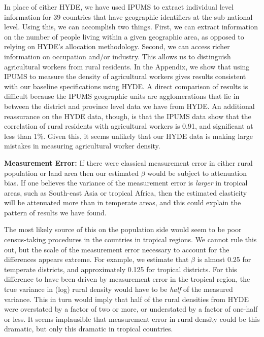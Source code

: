 \documentclass[11pt]{article}
\begin{document}
In place of either HYDE, we have used IPUMS \nocite{ipums} to extract individual level information for 39 countries that have geographic identifiers at the sub-national level. Using this, we can accomplish two things. First, we can extract information on the number of people living within a given geographic area, as opposed to relying on HYDE's allocation methodology. Second, we can access richer information on occupation and/or industry. This allows us to distinguish agricultural workers from rural residents. In the Appendix, we show that using IPUMS to measure the density of agricultural workers gives results consistent with our baseline specifications using HYDE. A direct comparison of results is difficult because the IPUMS geographic units are agglomerations that lie in between the district and province level data we have from HYDE. An additional reassurance on the HYDE data, though, is that the IPUMS data show that the correlation of rural residents with agricultural workers is 0.91, and significant at less than 1\%. Given this, it seems unlikely that our HYDE data is making large mistakes in measuring agricultural worker density.

\vspace{.5cm}\noindent\textbf{Measurement Error:} If there were classical measurement error in either rural population or land area then our estimated $\beta$ would be subject to attenuation bias. If one believes the variance of the measurement error is \textit{larger} in tropical areas, such as South-east Asia or tropical Africa, then the estimated elasticity will be attenuated more than in temperate areas, and this could explain the pattern of results we have found. 

The most likely source of this on the population side would seem to be poor census-taking procedures in the countries in tropical regions. We cannot rule this out, but the scale of the measurement error necessary to account for the differences appears extreme. For example, we estimate that $\beta$ is almost 0.25 for temperate districts, and approximately 0.125 for tropical districts. For this difference to have been driven by measurement error in the tropical region, the true variance in (log) rural density would have to be \textit{half} of the measured variance. This in turn would imply that half of the rural densities from HYDE were overstated by a factor of two or more, or understated by a factor of one-half or less. It seems implausible that measurement error in rural density could be this dramatic, but only this dramatic in tropical countries.
\end{document}
